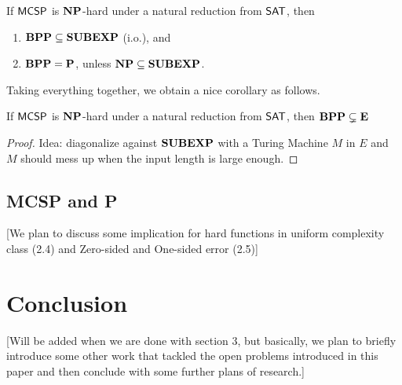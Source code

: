 \documentclass[11pt]{article}
\begin{document}
\begin{theorem}
	If $\mathsf{MCSP}$ is $\mathbf{NP}$-hard under a natural reduction from $\mathsf{SAT}$, then
	\begin{enumerate} [1.]
		\item $\mathbf{BPP} \subseteq \mathbf{SUBEXP}$ (i.o.), and
		\item $\mathbf{BPP} = \mathbf{P}$, unless $\mathbf{NP} \subseteq \mathbf{SUBEXP}$.
	\end{enumerate}
\end{theorem}

Taking everything together, we obtain a nice corollary as follows.

\begin{corollary}
	If $\mathsf{MCSP}$ is $\mathbf{NP}$-hard under a natural reduction from $\mathsf{SAT}$, then $\mathbf{BPP} \subsetneq \mathbf{E}$
\end{corollary}

\begin{proof}
	Idea: diagonalize against $\mathbf{SUBEXP}$ with a Turing Machine $M$ in $E$ and $M$ should mess up when the input length is large enough.
\end{proof}

\subsection{MCSP and P}
[We plan to discuss some implication for hard functions in uniform complexity class (2.4) and Zero-sided and One-sided error (2.5)] 

\section{Conclusion}

[Will be added when we are done with section 3, but basically, we plan to briefly introduce some other work that tackled the open problems introduced in this paper and then conclude with some further plans of research.]



\end{document}
